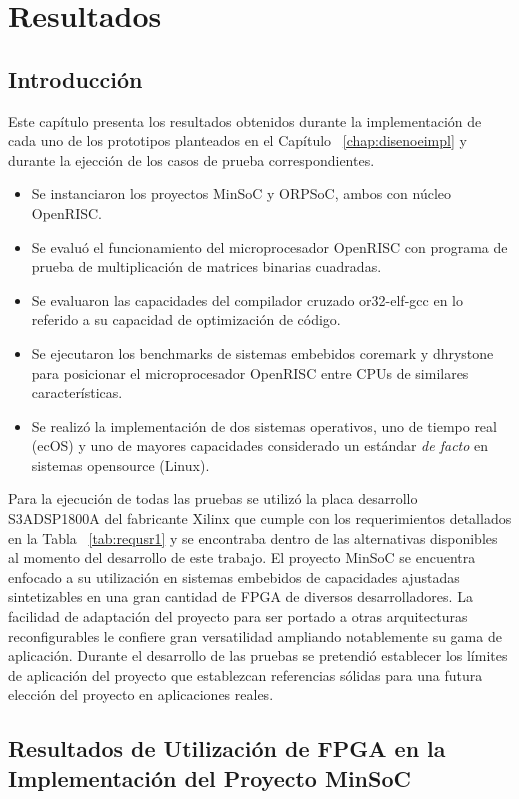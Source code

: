 \chapter{Resultados} \label {chap:resultados}
	\section{Introducción} 
	
	Este capítulo presenta los resultados obtenidos durante la implementación de cada uno de los prototipos planteados en el Capítulo
	~\ref{chap:disenoeimpl} y durante la ejección de los casos de prueba correspondientes. 
\begin{itemize}
\item Se instanciaron los proyectos MinSoC y ORPSoC, ambos con núcleo OpenRISC. 
\item Se evaluó el funcionamiento del microprocesador OpenRISC con programa de prueba de multiplicación de matrices binarias cuadradas.
\item Se evaluaron las capacidades del compilador cruzado or32-elf-gcc en lo referido a su capacidad de optimización de código. 
\item Se ejecutaron los benchmarks de sistemas embebidos coremark y dhrystone para posicionar el microprocesador OpenRISC entre CPUs de similares
características.
\item Se realizó la implementación de dos sistemas operativos, uno de tiempo real (ecOS) y uno de mayores capacidades considerado un estándar
\textit{de facto} en sistemas opensource (Linux). 
\end{itemize}				
				
	Para la ejecución de todas las pruebas se utilizó la placa desarrollo S3ADSP1800A del fabricante Xilinx que cumple con los requerimientos detallados
	en la Tabla ~\ref{tab:requsr1} y se encontraba dentro de las alternativas disponibles al momento del desarrollo de este trabajo. El proyecto MinSoC
	se encuentra enfocado a su utilización en sistemas embebidos de capacidades ajustadas sintetizables en una gran cantidad de FPGA de diversos
	desarrolladores. La facilidad de adaptación del proyecto para ser portado a otras arquitecturas reconfigurables le confiere gran versatilidad
	ampliando notablemente su gama de aplicación. Durante el desarrollo de las pruebas se pretendió establecer los límites de aplicación del proyecto
	que establezcan referencias sólidas para una futura elección del proyecto en aplicaciones reales.


	\newpage
	\section{Resultados de Utilización de FPGA en la Implementación del Proyecto MinSoC}

